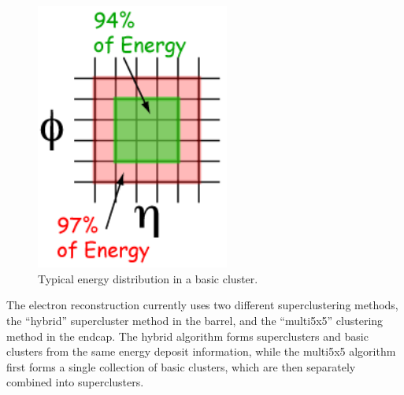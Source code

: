  \begin{figure}[htb]
  \begin{center}
    \includegraphics[width=180pt]{Figures/elec-BasicCluster-opaque.png}
  \end{center}
  \caption[\fixspacing Typical energy distribution in a basic cluster]
	  {\fixspacing Typical energy distribution in a basic cluster.}
  \label{fig:BasicCluster}
 \end{figure}


The electron reconstruction currently uses two different 
superclustering methods, 
the ``hybrid'' supercluster method in the barrel, 
and the ``multi5x5'' clustering method in the endcap.  
The hybrid algorithm forms superclusters 
and basic clusters from the same energy deposit 
information, 
while the multi5x5 algorithm first forms 
a single collection of basic clusters, 
which are then separately combined into superclusters.  




